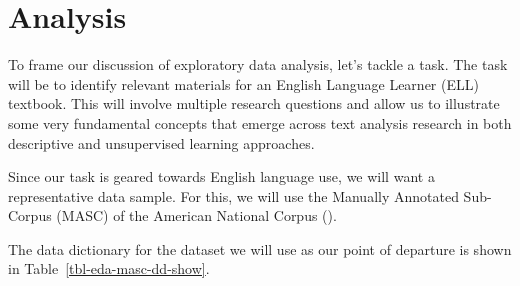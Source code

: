 \documentclass[
  letterpaper,
]{latex/krantz}
\theoremstyle{definition}
\theoremstyle{remark}
\begin{document}
\section{Analysis}\label{sec-eda-analysis}

To frame our discussion of exploratory data analysis, let's tackle a
task. The task will be to identify relevant materials for an English
Language Learner (ELL) textbook. This will involve multiple research
questions and allow us to illustrate some very fundamental concepts that
emerge across text analysis research in both descriptive and
unsupervised learning approaches.

Since our task is geared towards English language use, we will want a
representative data sample. For this, we will use the Manually Annotated
Sub-Corpus (MASC) of the American National Corpus
().

The data dictionary for the dataset we will use as our point of
departure is shown in Table~\ref{tbl-eda-masc-dd-show}.
\end{document}
